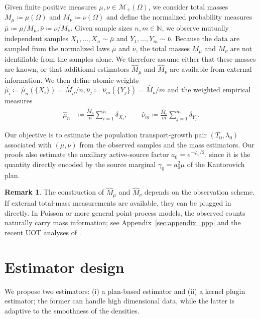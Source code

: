 \documentclass[11pt,reqno]{amsart}
\theoremstyle{definition}
\newtheorem{remark}{Remark}
\newcommand{\N}{\mathbb{N}}
\renewcommand{\hat}{\widehat}
\newcommand{\mM}{\mathcal{M}}
\begin{document}
Given finite positive measures $\mu,\nu \in \mM_+(\Omega)$, we consider total masses
$    M_\mu \coloneqq \mu(\Omega)$ and $    M_\nu \coloneqq \nu(\Omega)$
and define the normalized probability measures $
    \bar\mu \coloneqq {\mu} / {M_\mu},
    \bar\nu \coloneqq {\nu} / {M_\nu}$.
Given sample sizes $n,m\in\N$, we observe mutually independent samples $X_1,\dots,X_n \sim \bar\mu$ and $Y_1,\dots,Y_m \sim \bar\nu$.
Because the data are sampled from the normalized laws $\bar\mu$ and $\bar\nu$, the total masses $M_\mu$ and $M_\nu$ are not identifiable from the samples alone. We therefore assume either that these masses are known, or that additional estimators $\hat M_\mu$ and $\hat M_\nu$ are available from external information.
We then define atomic weights
    $\hat\mu_i \coloneqq \hat\mu_n(\{X_i\}) = \hat M_\mu/n, \hat\nu_j \coloneqq \hat\nu_m(\{Y_j\}) = \hat M_\nu/m$ and the weighted empirical measures
\begin{align}
    \hat\mu_n
    &\coloneqq
    \frac{\hat M_\mu}{n}\sum_{i=1}^n \delta_{X_i},\qquad 
    \hat\nu_m
    \coloneqq
    \frac{\hat M_\nu}{m}\sum_{j=1}^m \delta_{Y_j}.
\end{align} 

    
Our objective is to estimate the population transport-growth pair $(T_0,\lambda_0)$ associated with $(\mu,\nu)$ from the observed samples and the mass estimators. Our proofs also estimate the auxiliary active-source factor $a_0=e^{-\varphi_0/2}$, since it is the quantity directly encoded by the source marginal $\gamma_0=a_0^2\mu$ of the Kantorovich plan.

\begin{remark}


The construction of $\hat M_\mu$ and $\hat M_\nu$ depends on the observation scheme. 
If external total-mass measurements are available, they can be plugged in directly. In Poisson or more general point-process models, the observed counts naturally carry mass information; see Appendix~\ref{sec:appendix_ppp} and the recent UOT analyses of \cite{HundrieserEtAl2025,struleva2025sharp}. 
\end{remark}

\section{Estimator design}

We propose two estimators: (i) a plan-based estimator and (ii) a kernel plugin estimator; the former can handle high dimensional data, while the latter is adaptive to the smoothness of the densities.
\end{document}
